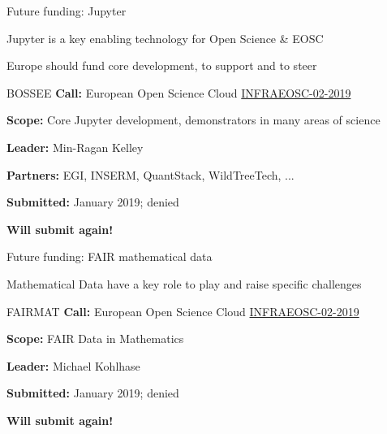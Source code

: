 \documentclass[svgnames]{beamer}
\begin{document}





\begin{frame}{Future funding: Jupyter}

  Jupyter is a key enabling technology for Open Science \& EOSC

  {\color{red}Europe should fund core development, to support and to steer}

  \pause
  \bigskip

  \begin{block}{BOSSEE}
    \textbf{Call:} European Open Science Cloud \href{http://ec.europa.eu/research/participants/portal/desktop/en/opportunities/h2020/topics/infraeosc-02-2019.html}{INFRAEOSC-02-2019}

    \textbf{Scope:} Core Jupyter development, demonstrators in many areas of science
    \medskip

    \textbf{Leader:} Min-Ragan Kelley

    \textbf{Partners:} EGI, INSERM, QuantStack, WildTreeTech, ...

    \textbf{Submitted:} January 2019; denied

    \textbf{Will submit again!}
  \end{block}
\end{frame}

\begin{frame}{Future funding: FAIR mathematical data}

  {\color{red}Mathematical Data have a key role to play and raise
    specific challenges} \pause\bigskip

  \begin{block}{FAIRMAT}
    \textbf{Call:} European Open Science Cloud \href{http://ec.europa.eu/research/participants/portal/desktop/en/opportunities/h2020/topics/infraeosc-02-2019.html}{INFRAEOSC-02-2019}

    \textbf{Scope:} FAIR Data in Mathematics
    \medskip

    \textbf{Leader:} Michael Kohlhase

    \textbf{Submitted:} January 2019; denied

    \textbf{Will submit again!}
  \end{block}
\end{frame}
\end{document}
